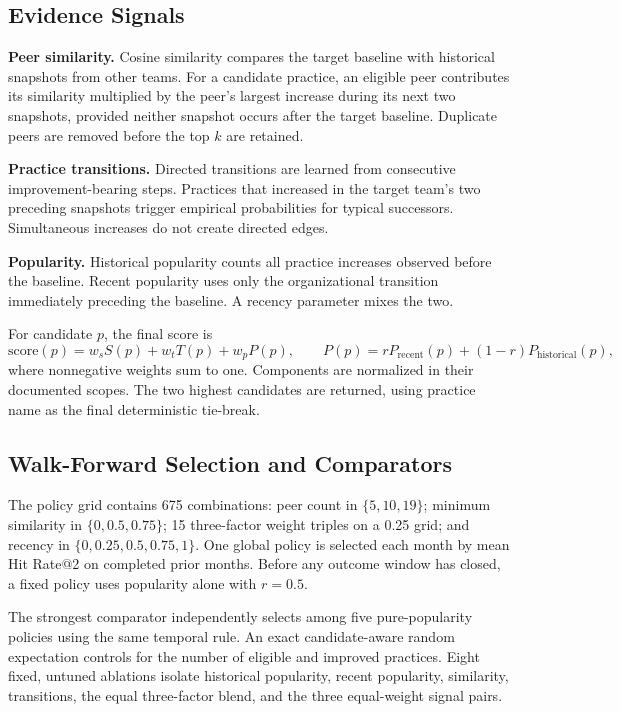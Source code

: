 \documentclass[runningheads]{llncs}
\begin{document}
\subsection{Evidence Signals}

\textbf{Peer similarity.} Cosine similarity compares the target baseline with historical snapshots from other teams. For a candidate practice, an eligible peer contributes its similarity multiplied by the peer's largest increase during its next two snapshots, provided neither snapshot occurs after the target baseline. Duplicate peers are removed before the top $k$ are retained.

\textbf{Practice transitions.} Directed transitions are learned from consecutive improvement-bearing steps. Practices that increased in the target team's two preceding snapshots trigger empirical probabilities for typical successors. Simultaneous increases do not create directed edges.

\textbf{Popularity.} Historical popularity counts all practice increases observed before the baseline. Recent popularity uses only the organizational transition immediately preceding the baseline. A recency parameter mixes the two.

For candidate $p$, the final score is
\begin{equation}
\mathrm{score}(p)=w_sS(p)+w_tT(p)+w_pP(p), \qquad
P(p)=rP_{\mathrm{recent}}(p)+(1-r)P_{\mathrm{historical}}(p),
\end{equation}
where nonnegative weights sum to one. Components are normalized in their documented scopes. The two highest candidates are returned, using practice name as the final deterministic tie-break.

\subsection{Walk-Forward Selection and Comparators}

The policy grid contains 675 combinations: peer count in $\{5,10,19\}$; minimum similarity in $\{0,0.5,0.75\}$; 15 three-factor weight triples on a 0.25 grid; and recency in $\{0,0.25,0.5,0.75,1\}$. One global policy is selected each month by mean Hit Rate@2 on completed prior months. Before any outcome window has closed, a fixed policy uses popularity alone with $r=0.5$.

The strongest comparator independently selects among five pure-popularity policies using the same temporal rule. An exact candidate-aware random expectation controls for the number of eligible and improved practices. Eight fixed, untuned ablations isolate historical popularity, recent popularity, similarity, transitions, the equal three-factor blend, and the three equal-weight signal pairs.
\end{document}
